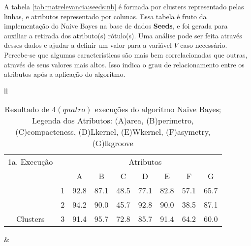 A tabela \ref{tab:matrelevancia:seeds:nb} é formada por clusters representado pelas linhas, e atributos representado por colunas. Essa tabela é fruto da implementação do Naive Bayes na base de dados \textbf{Seeds}, e foi  gerada para auxiliar a retirada dos atributo(s) rótulo(s). Uma análise pode ser feita através desses dados e ajudar a definir um valor para a variável ${V}$ caso necessário. Percebe-se que algumas características são mais bem correlacionadas que  outras, através de seus valores mais altos. Isso indica o grau de relacionamento entre os atributos após a aplicação do algoritmo. 


\begin{table}[!h]
\caption{Resultado de ${4(quatro)}$ execuções do algoritmo Naive Bayes; Legenda dos Atributos: (A)area, (B)perimetro, (C)compacteness, (D)Lkernel, (E)Wkernel, (F)asymetry, (G)lkgroove}
 \begin{tabular}{ll}

  
   \small\addtolength{\tabcolsep}{-5pt}
     \begin{tabular}{|cl|c|c|c|c|c|c|c|}
        \hline \hline
            {\tiny 1a. Execução}     &   & \multicolumn{7}{c|}{Atributos}                                               \\ \cline{3-9} 
       \multicolumn{1}{|l}{}                            &   & A    & B & C & D & E & F & G \\ \hline
        \multicolumn{1}{|c|}{}                           & 1 & 92.8 & 87.1   & 48.5      & 77.1 & 82.8 & 57.1   & 65.7   \\ \cline{2-9} 
        \multicolumn{1}{|c|}{}                           & 2 & 94.2 & 90.0   & 45.7      & 92.8 & 90.0 & 38.5  & 87.1  \\ \cline{2-9} 
        \multicolumn{1}{|c|}{\multirow{-3}{*}{Clusters}} & 3 & 91.4 & 95.7   & 72.8      & 85.7 & 91.4 & 64.2  & 60.0  \\ \hline
      \end{tabular}
 &
 

\end{tabular}
\end{table}
